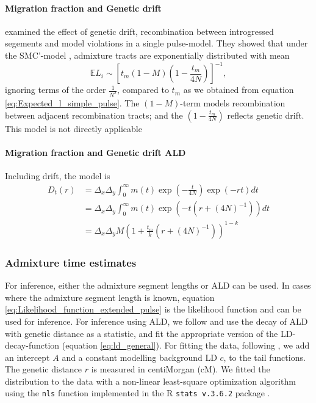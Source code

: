 \documentclass[11pt]{article}
\let\oldparagraph\paragraph
\renewcommand{\paragraph}[1]{\oldparagraph{#1}\mbox{}}
\begin{document}
\paragraph{Migration fraction and Genetic drift}
\cite{liang_lengths_2014} examined the effect of genetic drift, recombination between introgressed segements and model violations in a single pulse-model. They showed that under the SMC'-model \citep{marjoram_fast_2006}, admixture tracts are exponentially distributed with mean
\begin{equation}
  \mathbb{E}L_i \sim  \left[t_m(1-M)\left(1-\frac{t_m}{4N}\right)\right]^{-1},
\end{equation}
ignoring terms of the order $\frac{1}{N^2}$, compared to $t_m$ as we obtained from equation \ref{eq:Expected_l_simple_pulse}. The $(1-M)$-term models recombination between adjacent recombination tracts; and the $\left(1-\frac{t_m}{4N}\right)$ reflects genetic drift. This model is not directly applicable 

\paragraph{Migration fraction and Genetic drift ALD}
Including drift, the model is
\begin{align}
    D_t(r) &= \Delta_x\Delta_y\int_0^\infty m(t)\exp\left(-\frac{t}{4N}\right)\exp(-rt) dt \nonumber\\
        &= \Delta_x\Delta_y\int_0^\infty m(t)\exp\left(-t(r+(4N)^{-1})\right) dt \label{eq:ld_drift}\\
&= \Delta_x\Delta_y M\left(1 + \frac{t_m}{k} (r+(4N)^{-1})\right) ^{1-k}        
\end{align}


\subsubsection{Admixture time estimates}\label{admixture time estimates}
For inference, either the admixture segment lengths or ALD can be used. In cases where the admixture segment length is known, equation \ref{eq:Likelihood_function_extended_pulse} is the likelihood function and can be used for inference. For inference using ALD,  we follow \cite{moorjani_history_2011} and use the decay of ALD with genetic distance as a statistic, and fit the appropriate version of the LD-decay-function (equation \ref{eq:ld_general}). For fitting the data, following \cite{moorjani_genetic_2016}, we add an intercept $A$ and a constant modelling background LD $c$, to the tail functions. The genetic distance $r$ is measured in centiMorgan (cM). We fitted the distribution to the data with  a non-linear least-square optimization algorithm using the \texttt{nls} function implemented in the R \texttt{stats v.3.6.2} package \citep{R_Core_Team_2019}.
\end{document}
